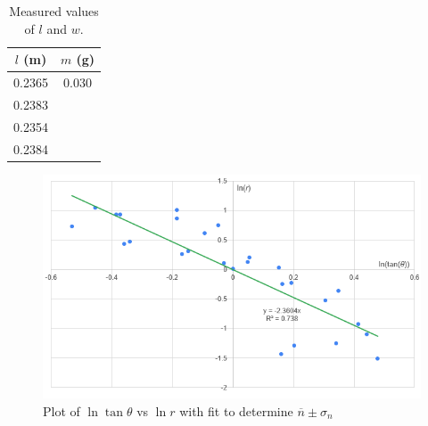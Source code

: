 \documentclass[12pt]{article}
\begin{document}
        \begin{table}[H]
            \centering
            \begin{tabular}{c|c}
                \(l\) (m) & \(m\) (g)\\
                \hline
                0.2365 & 0.030\\
                0.2383 &\\
                0.2354 &\\
                0.2384 &\\
            \end{tabular}
            \caption{Measured values of \(l\) and \(w\).}
        \end{table}
        \begin{figure}[H]
            \centering
            \includegraphics[width = \linewidth]{linest.png}
            \caption{Plot of \(\ln \tan \theta\) vs \(\ln r\) with fit to determine \(\overline{n} \pm \sigma_n\)}
        \end{figure}
\end{document}
